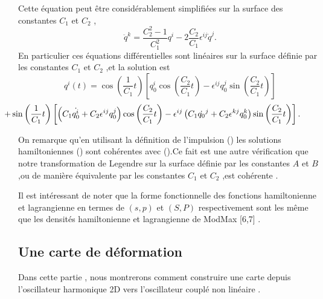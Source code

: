 \documentclass[12pt,a4paper, openany]{article}
\begin{document}
		  Cette équation peut \^{e}tre considérablement simplifiées sur la surface des constantes $C_1$ et $C_2$ ,
		  \begin{equation}
		  \ddot{q}^k=\frac{C^{2}_2-1}{C^2_1}q^i -2\frac{C_2}{C_1}\epsilon^{ij}\dot{q}^j .	
		  \end{equation}
		  En particulier ces équations différentielles sont linéaires sur la surface définie par les constantes $C_1$ et $C_2$ ,et la solution est 
		  \begin{equation*}
		  	q^i(t)=\cos\left(\frac{1}{C_1}t\right)\left[q_0^i\cos\left(\frac{C_2}{C_1}t\right)-\epsilon^{ij}q_0^j\sin\left(\frac{C_2}{C_1}t\right)\right]
		  \end{equation*}
		  	\begin{equation}
		  	\hspace{-1.5cm}+\sin\left(\frac{1}{C_1}t\right)\left[\left(C_1\dot{q^i_0}+C_2\epsilon^{ij}q^j_0\right)\cos\left(\frac{C_2}{C_1}t\right)-\epsilon^{ij}\left(C_1\dot{q_0}^j+C_2\epsilon^{kj}q^k_0\right)\sin\left(\frac{C_2}{C_1}t\right)\right].
		  \end{equation}
		  
		  On remarque qu'en utilisant la définition de l'impulsion () les solutions hamiltoniennes () sont cohérentes avec ().Ce fait est une autre vérification que notre transformation de Legendre sur la surface définie par les constantes $A$ et $B$ ,ou de manière équivalente par les constantes $C_1$ et $C_2$ ,est cohérente .
		  
		  Il est intéressant de noter que la forme fonctionnelle des fonctions hamiltonienne et lagrangienne en termes de $(s,p)$ et  $(S,P)$ respectivement sont les m\^{e}me que les densités hamiltonienne et lagrangienne de ModMax [6,7]  .
		  \subsection{Une carte de déformation}
		   Dans cette partie , nous montrerons comment construire une carte depuis l'oscillateur harmonique 2D vers l'oscillateur couplé non linéaire .
		  
\end{document}
